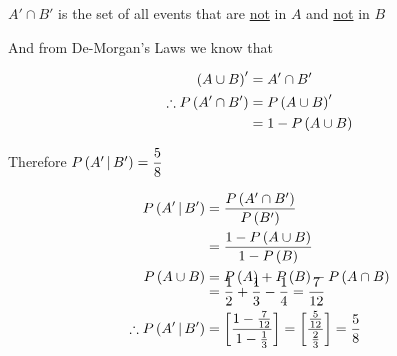 \documentclass[14pt,fleqn]{extarticle}
\begin{document}
\begin{question}
\begin{step}
     $A'\cap B'$ is the set of all events that are \underline{not} in $A$ and \underline{not} in $B$\newline 
     
     And from De-Morgan's Laws we know that 
     
     \begin{align}
	\left(A\cup B \right)' &= A'\cap B'  \\
	\therefore P\left( A'\cap B'\right) &= P \left(A\cup B \right)' \\
	&= 1 - P\left( A\cup B\right)
\end{align}
     
\end{step}

\begin{step}
  \begin{options} 
     \correct 
       
     Therefore $P\left(A'\,\vert\,B'\right) = \dfrac{5}{8}$ 
        
    \end{options} 
     \reason 
     
     \begin{align}
	P\left(A'\,\vert\,B'\right) &= \dfrac{P\left( A'\cap B'\right)}{P\left( B'\right)} \\
	&= \dfrac{1-P\left( A\cup B\right)}{1-P\left( B\right)} \\
	P\left( A\cup B\right) &= P\left( A\right) + P\left( B\right) - P\left( A\cap B\right) \\[-10pt]
	&= \frac{1}{2} + \frac{1}{3} - \frac{1}{4} = \frac{7}{12} \\
	\therefore P\left(A'\,\vert\,B'\right) &= \left[\dfrac{1-\frac{7}{12}}{1-\frac{1}{3}}  \right]= \left[\dfrac{\frac{5}{12}}{\frac{2}{3}} \right] = \frac{5}{8}
\end{align}
       
\end{step}
\end{question} 
\end{document}
